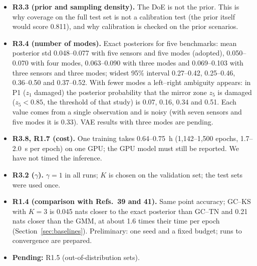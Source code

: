 \documentclass[11pt]{article}
\begin{document}
\begin{itemize}
behaves as an energy-weighted equivalent stiffness (Section~\ref{sec:testB}).
\item \textbf{R3.3 (prior and sampling density).} The DoE is not the prior. This is why coverage on the full test set
is not a calibration test (the prior itself would score 0.811), and why calibration is checked on the prior scenarios.
\item \textbf{R3.4 (number of modes).} Exact posteriors for five benchmarks: mean posterior std 0.048--0.077 with five
sensors and five modes (adopted), 0.050--0.070 with four modes, 0.063--0.090 with three modes and 0.069--0.103 with
three sensors and three modes; widest 95\% interval 0.27--0.42, 0.25--0.46, 0.36--0.50 and 0.37--0.52. With fewer modes
a left--right ambiguity appears: in P1 ($z_1$ damaged) the posterior probability that the mirror zone $z_5$ is damaged
($z_5<0.85$, the threshold of that study) is 0.07, 0.16, 0.34 and 0.51. Each value comes from a single observation and is noisy (with seven sensors and five
modes it is 0.33). VAE results with three modes are pending.
\item \textbf{R3.8, R1.7 (cost).} One training takes 0.64--0.75~h (1,142--1,500 epochs, 1.7--2.0~s per epoch) on one
GPU; the GPU model must still be reported. We have not timed the inference.
\item \textbf{R3.2 ($\gamma$).} $\gamma=1$ in all runs; $K$ is chosen on the validation set; the test sets were used
once.
\item \textbf{R1.4 (comparison with Refs.~39 and 41).} Same point accuracy; GC--KS with $K=3$ is 0.045 nats closer to the
exact posterior than GC--TN and 0.21 nats closer than the GMM, at about 1.6 times their time per epoch
(Section~\ref{sec:baselines}). Preliminary: one seed and a fixed budget; runs to convergence are prepared.
\item \textbf{Pending:} R1.5 (out-of-distribution sets).
\end{itemize}

\end{document}
